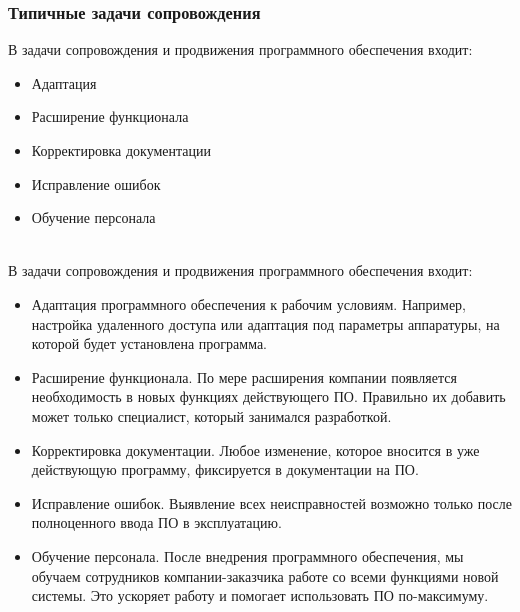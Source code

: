 \documentclass[lecturenotes]{../industrial-development}
\begin{document}
\begin{frame} \frametitle{Типичные задачи сопровождения}
В задачи сопровождения и продвижения программного обеспечения входит:
\begin{itemize}
	\item Адаптация
	\item Расширение функционала
	\item Корректировка документации
	\item Исправление ошибок
	\item Обучение персонала
\end{itemize}
\end{frame}
\lecturenotes
\\В задачи сопровождения и продвижения программного обеспечения входит:\\
\begin{itemize}
	\item Адаптация программного обеспечения к рабочим условиям. Например, настройка удаленного доступа или адаптация под параметры аппаратуры, на которой будет установлена программа.
	\item Расширение функционала. По мере расширения компании появляется необходимость в новых функциях действующего ПО. Правильно их добавить может только специалист, который занимался разработкой.
	\item Корректировка документации. Любое изменение, которое вносится в уже действующую программу, фиксируется в документации на ПО.
	\item Исправление ошибок. Выявление всех неисправностей возможно только после полноценного ввода ПО в эксплуатацию.
	\item Обучение персонала. После внедрения программного обеспечения, мы обучаем сотрудников компании-заказчика работе со всеми функциями новой системы. Это ускоряет работу и помогает использовать ПО по-максимуму. 
\end{itemize}
\end{document}
